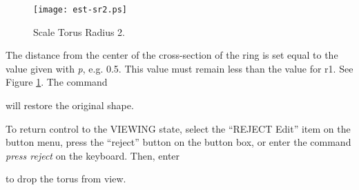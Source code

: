 \begin{figure}
\centering \texttt{[image: est-sr2.ps]}
\caption{Scale Torus Radius 2.}
\label{est-sr2}
\end{figure}


The distance from the center of the cross-section of the ring is set equal
to the value given with {\em p}, e.g. 0.5.
This value must remain less than the value for r1.
See Figure \ref{est-sr2}.
The command


will restore the original shape.

To return control to the VIEWING state, select the ``REJECT Edit''
item on the button menu, press the ``reject'' button on the button box,
or enter the command {\em press reject} on the keyboard.
Then, enter


to drop the torus from view.
